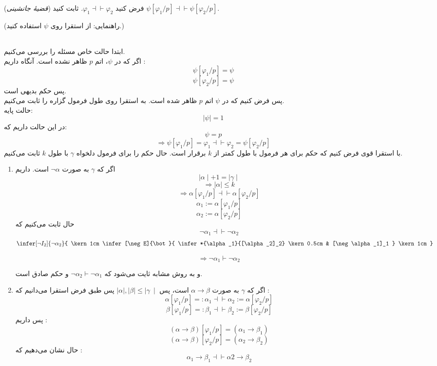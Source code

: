 
	(\emph{قضیهٔ جانشینی})
	فرض کنید
	$\varphi_1\dashv\vdash\varphi_2$.
	ثابت کنید
	$\psi[\varphi_1/p]\dashv\vdash\psi[\varphi_2/p]$.
	
	(راهنمایی: از استقرا روی $\psi$ استفاده کنید.)
	\begin{ans}
	\\	ابتدا حالت خاص مسئله را بررسی می‌کنیم. \\ اگر که در $\psi$، اتم ${p}$ ظاهر نشده است. آنگاه  داریم : \\
	$$
		\psi[\varphi_1/p] = \psi
	$$
	$$
		\psi[\varphi_2/p] = \psi
	$$
	پس حکم بدیهی است.\\
	پس فرض کنیم که در $\psi$ اتم $p$ ظاهر شده است. به استقرا روی طول فرمول گزاره را ثابت می‌کنیم. \\
	حالت پایه:
	$$ \mid \psi \mid = 1 $$
	 در این حالت داریم که‌:
	 $$ \psi = p $$
	$$\Longrightarrow {\psi[\varphi_1/p] = \varphi_1 \dashv\vdash \varphi_2 = \psi[\varphi_2/p]}$$
	با استقرا قوی فرض کنیم که حکم برای هر فرمول با طول کمتر از $k$ برقرار است. حال حکم را برای فرمول‌ دلخواه $\gamma$ با طول $k$ ثابت می‌کنیم.
	\quad\vspace{0.5 cm}
	\begin{enumerate}
		\item اگر که $\gamma$ به صورت $\neg \alpha$ است. داریم
		$$\mid \alpha \mid + 1 = \mid \gamma \mid$$
		$$\Longrightarrow {\mid \alpha \mid \le k}$$
		$$\Longrightarrow {\alpha[\varphi_1/p] \dashv\vdash \alpha[\varphi_2/p]}$$
		$$
			\alpha_1 := \alpha[\varphi_1/p]
		$$
		$$
			\alpha_2 := \alpha[\varphi_2/p]
		$$
		حال ثابت می‌کنیم که
		$$ \neg \alpha_1 \dashv\vdash \neg \alpha_2$$  
		$$
			\infer[\neg I_2]{\neg \alpha_2}{
				\kern 1cm \infer[\neg E]{\bot}{
					\infer*{\alpha_1}{[\alpha_2]_2} \kern 0.5cm
					& 
					[\neg \alpha_1]_1
				} \kern 1cm
			}
		$$
	
		$$
			\Longrightarrow {\neg \alpha_1 \vdash \neg \alpha_2}	
		$$
	
	و به روش مشابه ثایت می‌شود که
		$ \neg \alpha_2 \vdash \neg \alpha_1$
	و حکم صادق است.
	\item   
		اگر که $\gamma$ به صورت
		$\alpha \rightarrow \beta$
		است، پس 
		$\mid \alpha \mid , \mid \beta \mid \le \mid \gamma\ \mid$
		پس طبق فرض استقرا می‌دانیم که :
		$$ 
		\alpha[\varphi_1/p] =: \alpha_1 \dashv\vdash \alpha_2 := \alpha[\varphi_2/p]
		$$
		$$
		\beta[\varphi_1/p] =: \beta_1 \dashv\vdash \beta_2 := 			\beta[\varphi_2/p]
		$$
			پس داریم :
		$$
		 	(\alpha \rightarrow \beta) [\varphi_1/p] = (\alpha_1 \rightarrow \beta_1)
		$$
		$$
			(\alpha \rightarrow \beta) [\varphi_2/p] = (\alpha_2 \rightarrow \beta_2)
		$$
		حال نشان می‌دهیم که :
		$$
			\alpha_1 \rightarrow \beta_1 \dashv\vdash \alpha2 \rightarrow \beta_2	
		$$
		

\end{enumerate}
\end{ans}
